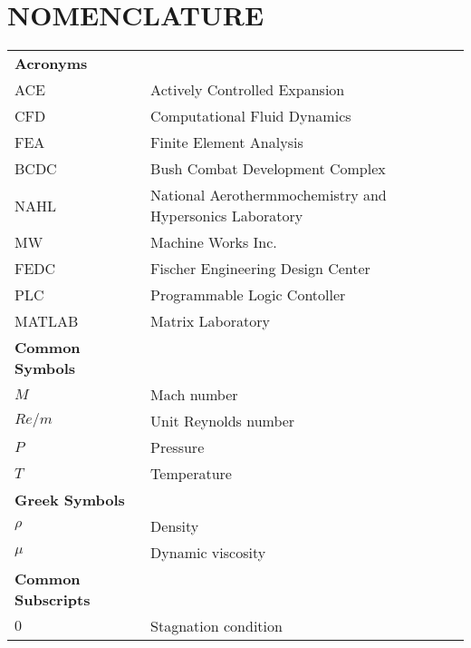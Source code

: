 %
% 
%


\chapter*{NOMENCLATURE}

\hspace*{-1.25in}
\vspace{-18pt}
\begin{spacing}{1.0}
    \begin{longtable}[htbp]{@{}p{} p{}@{}}
       
        \textbf{Acronyms}\\ [2ex] 
		ACE	& Actively Controlled Expansion\\ [2ex] %
		CFD	& Computational Fluid Dynamics\\ [2ex] 
		FEA & Finite Element Analysis\\	[2ex]
		BCDC & Bush Combat Development Complex\\ [2ex]
		NAHL & National Aerothermmochemistry and Hypersonics Laboratory\\ [2ex]
		MW & Machine Works Inc.\\ [2ex]
		FEDC & Fischer Engineering Design Center\\ [2ex]
        PLC & Programmable Logic Contoller\\ [2ex]
        MATLAB & Matrix Laboratory\\ [2ex] 

        \textbf{Common Symbols}\\ [2ex] 
        $M$ & Mach number\\ [2ex]
        $Re/m$ & Unit Reynolds number\\ [2ex]
        $P$ & Pressure\\ [2ex]
        $T$ & Temperature\\ [2ex]

        \textbf{Greek Symbols}\\ [2ex] 
        $\rho$ & Density\\ [2ex]
        $\mu$ & Dynamic viscosity\\ [2ex]

        \textbf{Common Subscripts}\\ [2ex] 
        $0$ & Stagnation condition\\ [2ex] 

	\end{longtable}
\end{spacing}

\pagebreak{}
